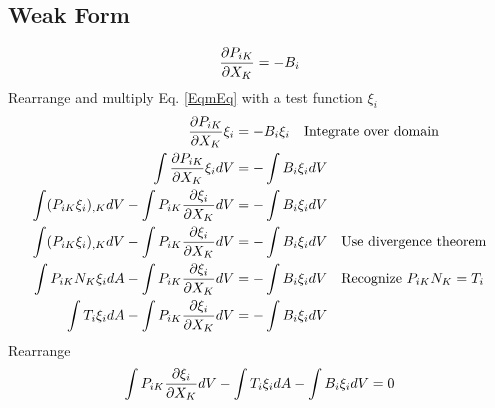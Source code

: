 \documentclass[12pt,3p]{article}
\numberwithin{equation}{section}
\begin{document}
\subsection{Weak Form}
\begin{align}\label{EqmEq}
\pdv{P_{iK}}{X_K} = - B_i
\end{align}
Rearrange and multiply Eq. \ref{EqmEq} with a test function $\xi_i$
\begin{align*}
\pdv{P_{iK}}{X_K} \xi_i &= - B_i \xi_i \quad \text{Integrate over domain} \\
\int \pdv{P_{iK}}{X_K} \xi_i dV &= - \int  B_i \xi_i dV \\
\int (P_{iK} \xi_i)_{,K} dV - \int P_{iK} \pdv{\xi_i}{X_K} dV &= - \int  B_i \xi_i dV \\
\int (P_{iK} \xi_i)_{,K} dV - \int P_{iK} \pdv{\xi_i}{X_K} dV &= - \int  B_i \xi_i dV \quad \text{Use divergence theorem} \\
\int P_{iK} N_K \xi_i dA - \int P_{iK} \pdv{\xi_i}{X_K} dV &= - \int  B_i \xi_i dV \quad \text{Recognize } P_{iK} N_K = T_i \\
\int T_i \xi_i dA - \int P_{iK} \pdv{\xi_i}{X_K} dV &= - \int B_i \xi_i dV 
\end{align*}
Rearrange 
\begin{equation}\label{2}
\int P_{iK} \pdv{\xi_i}{X_K} dV - \int T_i \xi_i dA - \int  B_i \xi_i dV = 0
\end{equation}
\end{document}
